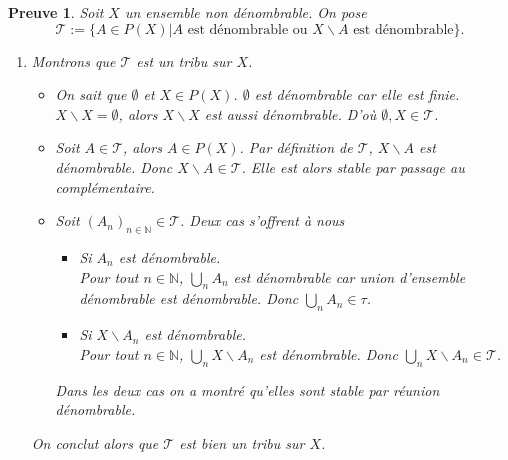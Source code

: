 \documentclass[a4paper, 12pt, french]{article}
\theoremstyle{break}
\newtheorem{preuve}{Preuve}[section]
\begin{document}
\begin{preuve}
   Soit $X$ un ensemble non dénombrable. On pose $$\mathcal{T} := \{ A \in P(X) | A \mbox{ est dénombrable ou } X \backslash A \mbox{ est dénombrable}\}.$$
   \begin{enumerate}
          \item Montrons que $\mathcal{T}$ est un tribu sur $X$.
          \begin{itemize}
                     \item On sait que $\emptyset$ et $X \in P(X)$. $\emptyset$ est dénombrable car elle est finie. $X \backslash X = \emptyset$, alors $X\backslash X$ est aussi dénombrable. D'où $\emptyset, X \in \mathcal{T}$.
                     \item Soit $A \in \mathcal{T}$, alors $A \in P(X)$. Par définition de $\mathcal{T}$, $X\backslash A$ est dénombrable. Donc $X \backslash A \in \mathcal{T}$. Elle est alors stable par passage au complémentaire.
                     \item Soit $(A_{n})_{n \in \mathbb{N}} \in \mathcal{T}$. Deux cas s'offrent à nous 
                     \begin{itemize}
                             \item[Cas 1: ] Si $A_{n}$ est dénombrable. \\
                             Pour tout $n \in \mathbb{N}$, $\bigcup_{n} A_{n}$ est dénombrable car union d'ensemble dénombrable est dénombrable. Donc $\bigcup_{n} A_{n} \in \tau$.
                             \item[Cas 2: ] Si $X\backslash A_{n}$ est dénombrable. \\
                             Pour tout $n \in \mathbb{N}$, $\bigcup_{n} X\backslash A_{n}$ est dénombrable. Donc $\bigcup_{n} X\backslash A_{n} \in \mathcal{T}$.
                     \end{itemize}
                     Dans les deux cas on a montré qu'elles sont stable par réunion dénombrable.
          \end{itemize}
          On conclut alors que $\mathcal{T}$ est bien un tribu sur $X$.
   \end{enumerate}
\end{preuve}
\end{document}
